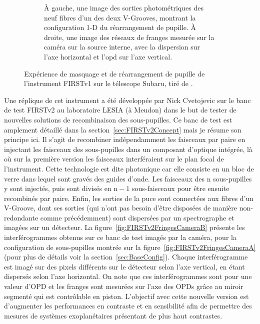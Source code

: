 \begin{figure}[ht!]
\begin{subfigure}[t]{0.49\textwidth}
        \caption{À gauche, une image des sorties photométriques des neuf fibres d'un des deux V-Grooves, montrant la configuration 1-D du réarrangement de pupille. À droite, une image des réseaux de franges mesurée sur la caméra sur la source interne, avec la dispersion sur l'axe horizontal et l'opd sur l'axe vertical.}
        \label{fig:FIRSTv1PupilMaskingSubaruB}
    \end{subfigure}
    \caption[Expérience de réarrangement de pupille de l'instrument FIRSTv1 sur le télescope Subaru.]{Expérience de masquage et de réarrangement de pupille de l'instrument FIRSTv1 sur le télescope Subaru, tiré de \cite{vievard2020a}.}
    \label{fig:FIRSTv1PupilMaskingSubaru}
\end{figure}

Une réplique de cet instrument a été développée par Nick Cvetojevic sur le banc de test \ac{FIRSTv2} au laboratoire \ac{LESIA} (à Meudon) dans le but de tester de nouvelles solutions de recombinaison des sous-pupilles. Ce banc de test est amplement détaillé dans la section~\ref{sec:FIRSTv2Concept} mais je résume son principe ici. Il s'agit de recombiner indépendamment les faisceaux par paire en injectant les faisceaux des sous-pupilles dans un composant d'optique intégrée, là où sur la première version les faisceaux interféraient sur le plan focal de l'instrument. Cette technologie est dite photonique car elle consiste en un bloc de verre dans lequel sont gravés des guides d'onde. Les faisceaux des n sous-pupilles y sont injectés, puis sont divisés en $\text{n} - 1$ sous-faisceaux pour être ensuite recombinés par paire. Enfin, les sorties de la puce sont connectées aux fibres d'un V-Groove, dont ses sorties (qui n'ont pas besoin d'être disposées de manière non-redondante comme précédemment) sont dispersées par un spectrographe et imagées sur un détecteur. La figure~\ref{fig:FIRSTv2FringesCameraB} présente les interférogrammes obtenus sur ce banc de test imagés par la caméra, pour la configuration de sous-pupilles montrée sur la figure~\ref{fig:FIRSTv2FringesCameraA} (pour plus de détails voir la section~\ref{sec:BaseConfig}). Chaque interférogramme est imagé sur des pixels différents sur le détecteur selon l'axe vertical, en étant dispersés selon l'axe horizontal. On note que ces interférogrammes sont pour une valeur d'\ac{OPD} et les franges sont mesurées sur l'axe des \ac{OPD}s grâce au miroir segmenté qui est contrôlable en piston. L'objectif avec cette nouvelle version est d'augmenter les performances en contraste et en sensibilité afin de permettre des mesures de systèmes exoplanétaires présentant de plus haut contrastes.

